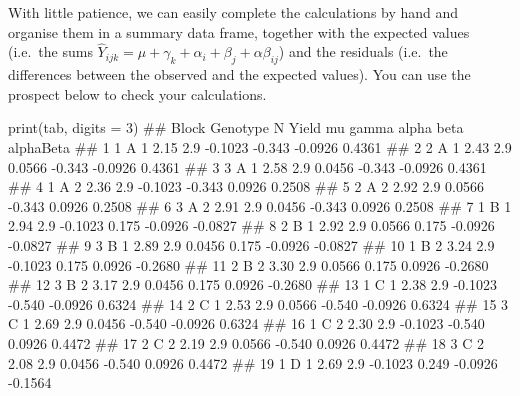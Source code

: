 \documentclass[a4paper,12pt,oneside]{book}
\newenvironment{Shaded}{\begin{snugshade}}{\end{snugshade}}
\newcommand{\DecValTok}[1]{#1}
\newcommand{\DocumentationTok}[1]{#1}
\newcommand{\FunctionTok}[1]{#1}
\newcommand{\AttributeTok}[1]{#1}
\newcommand{\NormalTok}[1]{#1}
\begin{document}
With little patience, we can easily complete the calculations by hand and organise them in a summary data frame, together with the expected values (i.e.~the sums \(\hat{Y}_{ijk} = \mu + \gamma_k + \alpha_i + \beta_j + \alpha\beta_{ij}\)) and the residuals (i.e.~the differences between the observed and the expected values). You can use the prospect below to check your calculations.

\vspace{12pt}
\scriptsize

\vspace{12pt}

\begin{Shaded}
\begin{Highlighting}[]
\FunctionTok{print}\NormalTok{(tab, }\AttributeTok{digits =} \DecValTok{3}\NormalTok{)}
\DocumentationTok{\#\#    Block Genotype N Yield  mu   gamma  alpha    beta alphaBeta}
\DocumentationTok{\#\# 1      1        A 1  2.15 2.9 {-}0.1023 {-}0.343 {-}0.0926    0.4361}
\DocumentationTok{\#\# 2      2        A 1  2.43 2.9  0.0566 {-}0.343 {-}0.0926    0.4361}
\DocumentationTok{\#\# 3      3        A 1  2.58 2.9  0.0456 {-}0.343 {-}0.0926    0.4361}
\DocumentationTok{\#\# 4      1        A 2  2.36 2.9 {-}0.1023 {-}0.343  0.0926    0.2508}
\DocumentationTok{\#\# 5      2        A 2  2.92 2.9  0.0566 {-}0.343  0.0926    0.2508}
\DocumentationTok{\#\# 6      3        A 2  2.91 2.9  0.0456 {-}0.343  0.0926    0.2508}
\DocumentationTok{\#\# 7      1        B 1  2.94 2.9 {-}0.1023  0.175 {-}0.0926   {-}0.0827}
\DocumentationTok{\#\# 8      2        B 1  2.92 2.9  0.0566  0.175 {-}0.0926   {-}0.0827}
\DocumentationTok{\#\# 9      3        B 1  2.89 2.9  0.0456  0.175 {-}0.0926   {-}0.0827}
\DocumentationTok{\#\# 10     1        B 2  3.24 2.9 {-}0.1023  0.175  0.0926   {-}0.2680}
\DocumentationTok{\#\# 11     2        B 2  3.30 2.9  0.0566  0.175  0.0926   {-}0.2680}
\DocumentationTok{\#\# 12     3        B 2  3.17 2.9  0.0456  0.175  0.0926   {-}0.2680}
\DocumentationTok{\#\# 13     1        C 1  2.38 2.9 {-}0.1023 {-}0.540 {-}0.0926    0.6324}
\DocumentationTok{\#\# 14     2        C 1  2.53 2.9  0.0566 {-}0.540 {-}0.0926    0.6324}
\DocumentationTok{\#\# 15     3        C 1  2.69 2.9  0.0456 {-}0.540 {-}0.0926    0.6324}
\DocumentationTok{\#\# 16     1        C 2  2.30 2.9 {-}0.1023 {-}0.540  0.0926    0.4472}
\DocumentationTok{\#\# 17     2        C 2  2.19 2.9  0.0566 {-}0.540  0.0926    0.4472}
\DocumentationTok{\#\# 18     3        C 2  2.08 2.9  0.0456 {-}0.540  0.0926    0.4472}
\DocumentationTok{\#\# 19     1        D 1  2.69 2.9 {-}0.1023  0.249 {-}0.0926   {-}0.1564}

\end{Highlighting}
\end{Shaded}
\end{document}
